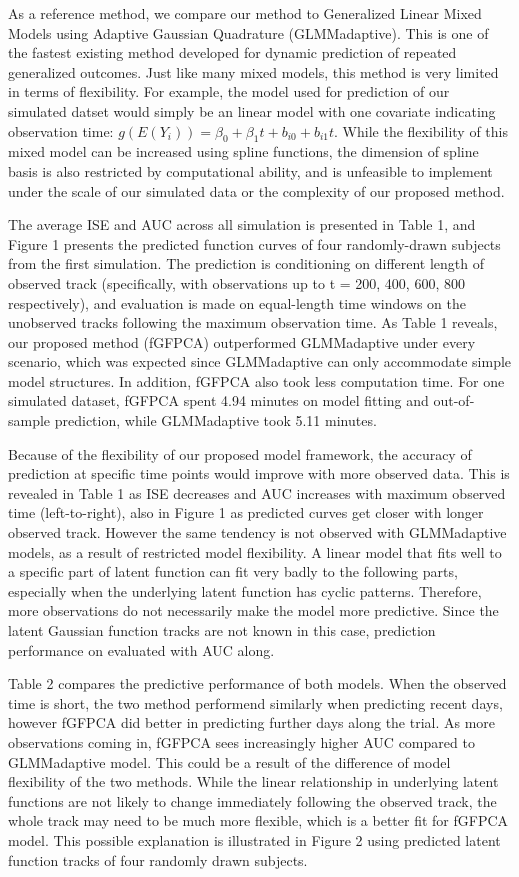 \documentclass[
  11pt,
]{article}
\begin{document}
As a reference method, we compare our method to Generalized Linear Mixed
Models using Adaptive Gaussian Quadrature (GLMMadaptive). This is one of
the fastest existing method developed for dynamic prediction of repeated
generalized outcomes. Just like many mixed models, this method is very
limited in terms of flexibility. For example, the model used for
prediction of our simulated datset would simply be an linear model with
one covariate indicating observation time:
\(g(E(Y_i)) = \beta_0+\beta_1t+b_{i0}+b_{i1}t\). While the flexibility
of this mixed model can be increased using spline functions, the
dimension of spline basis is also restricted by computational ability,
and is unfeasible to implement under the scale of our simulated data or
the complexity of our proposed method.

The average ISE and AUC across all simulation is presented in Table 1,
and Figure 1 presents the predicted function curves of four
randomly-drawn subjects from the first simulation. The prediction is
conditioning on different length of observed track (specifically, with
observations up to t = 200, 400, 600, 800 respectively), and evaluation
is made on equal-length time windows on the unobserved tracks following
the maximum observation time. As Table 1 reveals, our proposed method
(fGFPCA) outperformed GLMMadaptive under every scenario, which was
expected since GLMMadaptive can only accommodate simple model
structures. In addition, fGFPCA also took less computation time. For one
simulated dataset, fGFPCA spent 4.94 minutes on model fitting and
out-of-sample prediction, while GLMMadaptive took 5.11 minutes.

Because of the flexibility of our proposed model framework, the accuracy
of prediction at specific time points would improve with more observed
data. This is revealed in Table 1 as ISE decreases and AUC increases
with maximum observed time (left-to-right), also in Figure 1 as
predicted curves get closer with longer observed track. However the same
tendency is not observed with GLMMadaptive models, as a result of
restricted model flexibility. A linear model that fits well to a
specific part of latent function can fit very badly to the following
parts, especially when the underlying latent function has cyclic
patterns. Therefore, more observations do not necessarily make the model
more predictive. Since the latent Gaussian function tracks are not known
in this case, prediction performance on evaluated with AUC along.

Table 2 compares the predictive performance of both models. When the
observed time is short, the two method performend similarly when
predicting recent days, however fGFPCA did better in predicting further
days along the trial. As more observations coming in, fGFPCA sees
increasingly higher AUC compared to GLMMadaptive model. This could be a
result of the difference of model flexibility of the two methods. While
the linear relationship in underlying latent functions are not likely to
change immediately following the observed track, the whole track may
need to be much more flexible, which is a better fit for fGFPCA model.
This possible explanation is illustrated in Figure 2 using predicted
latent function tracks of four randomly drawn subjects.
\end{document}
